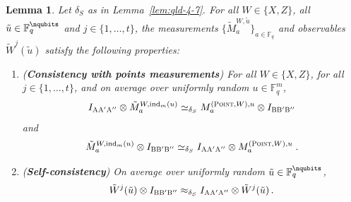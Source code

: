 \documentclass[11pt]{article}
\newtheorem{lemma}[theorem]{Lemma}
\theoremstyle{definition}
\newcommand{\Id}{\ensuremath{I}}
\newcommand{\F}{\ensuremath{\mathbb{F}}}
\newcommand{\ind}{\ensuremath{\mathrm{ind}}}
\newcommand{\labelstyle}[1]{\ensuremath{\textsc{#1}}\xspace}
\newcommand{\alice}{\labelstyle{A}}
\newcommand{\bob}{\labelstyle{B}}
\newcommand{\typestyle}[1]{\ensuremath{\textsc{#1}}\xspace}
\newcommand{\Point}{\typestyle{Point}}
\begin{document}
\begin{lemma}
  \label{lem:qld-construct-the-paulis}
Let $\delta_S$ as in Lemma~\ref{lem:qld-4-7}.
For all $W \in \{X,Z\}$, all $\tilde{u} \in \F_q^\nqubits$ and $j \in \{1,\ldots,t\}$, the measurements $\{ \tilde{M}^{W,\tilde{u}}_a \}_{a \in \F_q}$ and observables $\tilde{W}^j(\tilde{u})$ satisfy the following properties:
\begin{enumerate}
\item (\textbf{Consistency with points measurements}) For all $W \in \{X,Z\}$, for all $j \in \{1,\ldots,t\}$, and on average over uniformly random $u \in \F_q^m$,
	\[
		\Id_{\alice \alice' \alice''} \otimes \tilde{M}^{W,\ind_m(u)}_a \simeq_{\delta_S} M^{(\Point,W),u}_a \otimes \Id_{\bob \bob' \bob''}
	\]
	and
	\[
		\tilde{M}^{W,\ind_m(u)}_a \otimes \Id_{\bob \bob' \bob''} \simeq_{\delta_S} \Id_{\alice \alice' \alice''} \otimes M^{(\Point,W),u}_a \;.
	\]	
	\item (\textbf{Self-consistency}) On average over uniformly random $\tilde{u} \in \F_q^\nqubits$,
	\[
		\tilde{W}^j(\tilde{u}) \otimes \Id_{\bob \bob' \bob''} \approx_{\delta_S} \Id_{\alice \alice' \alice''} \otimes \tilde{W}^j(\tilde{u})\,.
	\]
\end{enumerate}
\end{lemma}
\end{document}
